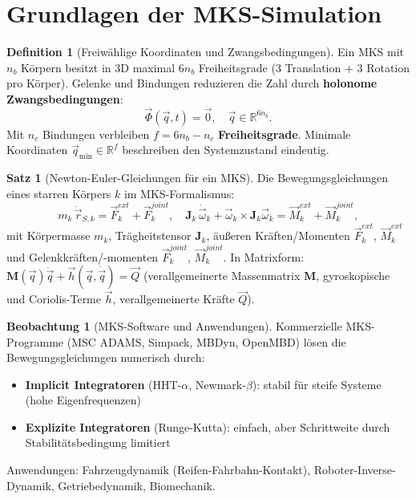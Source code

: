 ﻿\documentclass[a4paper,12pt]{report}
\theoremstyle{definition}
\newtheorem{definition}{Definition}
\newtheorem{satz}{Satz}
\newtheorem{beobachtung}{Beobachtung}
\begin{document}
\section{Grundlagen der MKS-Simulation}

\begin{definition}[Freiwählige Koordinaten und Zwangsbedingungen]
Ein MKS mit $n_b$ Körpern besitzt in 3D maximal $6n_b$ Freiheitsgrade
(3 Translation + 3 Rotation pro Körper). Gelenke und Bindungen
reduzieren die Zahl durch \textbf{holonome Zwangsbedingungen}:
\[
  \vec{\Phi}(\vec{q}, t) = \vec{0}, \quad \vec{q} \in \mathbb{R}^{6n_b}.
\]
Mit $n_c$ Bindungen verbleiben $f = 6n_b - n_c$ \textbf{Freiheitsgrade}.
Minimale Koordinaten $\vec{q}_{\min} \in \mathbb{R}^f$ beschreiben den
Systemzustand eindeutig.
\end{definition}

\begin{satz}[Newton-Euler-Gleichungen für ein MKS]
Die Bewegungsgleichungen eines starren Körpers $k$ im MKS-Formalismus:
\[
  m_k\,\ddot{\vec{r}}_{S,k} = \vec{F}_k^{ext} + \vec{F}_k^{joint},
  \quad
  \mathbf{J}_k\,\dot{\vec{\omega}}_k + \vec{\omega}_k \times \mathbf{J}_k\vec{\omega}_k
  = \vec{M}_k^{ext} + \vec{M}_k^{joint},
\]
mit Körpermasse $m_k$, Trägheitstensor $\mathbf{J}_k$,
äußeren Kräften/Momenten $\vec{F}_k^{ext}$, $\vec{M}_k^{ext}$
und Gelenkkräften/-momenten $\vec{F}_k^{joint}$, $\vec{M}_k^{joint}$.
In Matrixform: $\mathbf{M}(\vec{q})\ddot{\vec{q}} + \vec{h}(\vec{q},\dot{\vec{q}}) = \vec{Q}$
(verallgemeinerte Massenmatrix $\mathbf{M}$, gyroskopische und Coriolis-Terme $\vec{h}$,
verallgemeinerte Kräfte $\vec{Q}$).
\end{satz}

\begin{beobachtung}[MKS-Software und Anwendungen]
Kommerzielle MKS-Programme (MSC ADAMS, Simpack, MBDyn, OpenMBD)
lösen die Bewegungsgleichungen numerisch durch:
\begin{itemize}
    \item[-] \textbf{Implicit Integratoren} (HHT-$\alpha$, Newmark-$\beta$):
          stabil für steife Systeme (hohe Eigenfrequenzen)
    \item[-] \textbf{Explizite Integratoren} (Runge-Kutta): einfach,
          aber Schrittweite durch Stabilitätsbedingung limitiert
\end{itemize}
Anwendungen: Fahrzeugdynamik (Reifen-Fahrbahn-Kontakt),
Roboter-Inverse-Dynamik, Getriebedynamik, Biomechanik.
\end{beobachtung}
\end{document}
